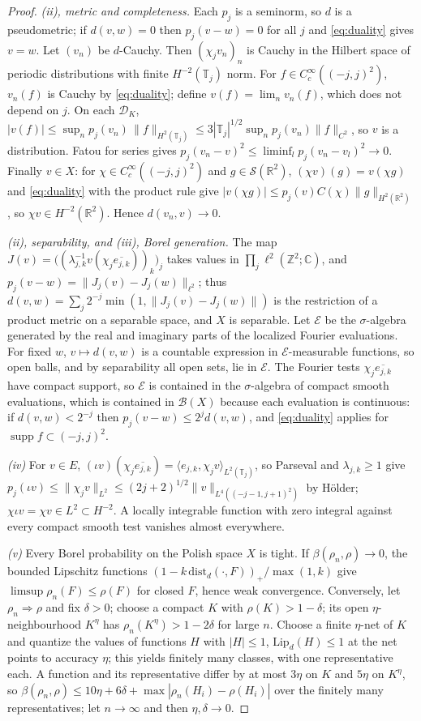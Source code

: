 \documentclass[11pt]{article}
\theoremstyle{plain}
\theoremstyle{definition}
\theoremstyle{remark}
\newcommand{\R}{\mathbb{R}}
\newcommand{\C}{\mathbb{C}}
\newcommand{\Z}{\mathbb{Z}}
\newcommand{\T}{\mathbb{T}}
\newcommand{\cB}{\mathcal{B}}
\newcommand{\cD}{\mathcal{D}}
\newcommand{\cE}{\mathcal{E}}
\newcommand{\cS}{\mathcal{S}}
\newcommand{\dist}{\mathrm{dist}}
\newcommand{\conj}[1]{\overline{#1}}
\DeclareMathOperator{\supp}{supp}
\begin{document}
\begin{proof}
\emph{(ii), metric and completeness.} Each $p_j$ is a seminorm, so $d$ is a
pseudometric; if $d(v,w)=0$ then $p_j(v-w)=0$ for all $j$ and \eqref{eq:duality}
gives $v=w$. Let $(v_n)$ be $d$-Cauchy. Then $(\chi_jv_n)_n$ is Cauchy in the
Hilbert space of periodic distributions with finite $H^{-2}(\T_j)$ norm. For
$f\in C_c^{\infty}((-j,j)^{2})$, $v_n(f)$ is Cauchy by \eqref{eq:duality}; define
$v(f)=\lim_nv_n(f)$, which does not depend on $j$. On each $\cD_K$,
$|v(f)|\le\sup_np_j(v_n)\,\|f\|_{H^{2}(\T_j)}\le3|\T_j|^{1/2}\sup_np_j(v_n)\|f\|_{C^{2}}$, so $v$
is a distribution. Fatou for series gives
$p_j(v_n-v)^{2}\le\liminf_{l}p_j(v_n-v_l)^{2}\to0$. Finally $v\in X$: for
$\chi\in C_c^{\infty}((-j,j)^{2})$ and $g\in\cS(\R^{2})$, $(\chi v)(g)=v(\chi g)$ and
\eqref{eq:duality} with the product rule give
$|v(\chi g)|\le p_j(v)C(\chi)\|g\|_{H^{2}(\R^{2})}$, so $\chi v\in H^{-2}(\R^{2})$. Hence
$d(v_n,v)\to0$.

\emph{(ii), separability, and (iii), Borel generation.} The map
$J(v)=\bigl((\lambda_{j,k}^{-1}v(\chi_j\conj{e_{j,k}}))_{k}\bigr)_{j}$ takes values in
$\prod_j\ell^{2}(\Z^{2};\C)$, and $p_j(v-w)=\|J_j(v)-J_j(w)\|_{\ell^{2}}$; thus
$d(v,w)=\sum_j2^{-j}\min(1,\|J_j(v)-J_j(w)\|)$ is the restriction of a product
metric on a separable space, and $X$ is separable. Let $\cE$ be the
$\sigma$-algebra generated by the real and imaginary parts of the localized
Fourier evaluations. For fixed $w$, $v\mapsto d(v,w)$ is a countable expression in
$\cE$-measurable functions, so open balls, and by separability all open sets,
lie in $\cE$. The Fourier tests $\chi_j\conj{e_{j,k}}$ have compact support, so
$\cE$ is contained in the $\sigma$-algebra of compact smooth evaluations, which is
contained in $\cB(X)$ because each evaluation is continuous: if
$d(v,w)<2^{-j}$ then $p_j(v-w)\le2^{j}d(v,w)$, and \eqref{eq:duality} applies for
$\supp f\subset(-j,j)^{2}$.

\emph{(iv)} For $v\in E$, $(\iota v)(\chi_j\conj{e_{j,k}})=\langle e_{j,k},\chi_jv\rangle_{L^{2}(\T_j)}$, so
Parseval and $\lambda_{j,k}\ge1$ give
$p_j(\iota v)\le\|\chi_jv\|_{L^{2}}\le(2j+2)^{1/2}\|v\|_{L^{4}((-j-1,j+1)^{2})}$ by H\"older;
$\chi\iota v=\chi v\in L^{2}\subset H^{-2}$. A locally integrable function with zero
integral against every compact smooth test vanishes almost everywhere.

\emph{(v)} Every Borel probability on the Polish space $X$ is tight. If
$\beta(\rho_n,\rho)\to0$, the bounded Lipschitz functions
$(1-k\,\dist_d(\cdot,F))_{+}/\max(1,k)$ give $\limsup\rho_n(F)\le\rho(F)$ for closed
$F$, hence weak convergence. Conversely, let $\rho_n\Rightarrow\rho$ and fix
$\delta>0$; choose a compact $K$ with $\rho(K)>1-\delta$; its open $\eta$-neighbourhood
$K^{\eta}$ has $\rho_n(K^{\eta})>1-2\delta$ for large $n$. Choose a finite $\eta$-net of
$K$ and quantize the values of functions $H$ with $|H|\le1$, $\mathrm{Lip}_d(H)\le1$
at the net points to accuracy $\eta$; this yields finitely many classes, with one
representative each. A function and its representative differ by at most $3\eta$
on $K$ and $5\eta$ on $K^{\eta}$, so
$\beta(\rho_n,\rho)\le10\eta+6\delta+\max|\rho_n(H_i)-\rho(H_i)|$ over the finitely many
representatives; let $n\to\infty$ and then $\eta,\delta\to0$.


\end{proof}
\end{document}
